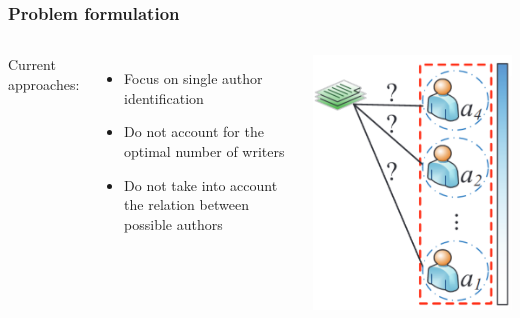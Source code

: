 \begin{frame}
\frametitle{Problem formulation}
\begin{columns}

Current approaches:
\begin{itemize}
    \item Focus on single author identification
    \item Do not account for the optimal number of writers
    \item Do not take into account the relation between possible authors
\end{itemize}

\includegraphics[width=1\linewidth]{img/single_author}

\end{columns}
\end{frame}
